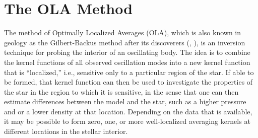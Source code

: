 \documentclass[twocolumn,twocolappendix]{aastex6}
\begin{document}
\section{The OLA Method} \label{sec:ola-method}
The method of Optimally Localized Averages (OLA), which is also known in geology as the Gilbert-Backus method after its discoverers (\citeyear{1968GeoJ...16..169B}, \citeyear{1970RSPTA.266..123B}), is an inversion technique for probing the interior of an oscillating body. 
The idea is to combine the kernel functions of all observed oscillation modes into a new kernel function that is ``localized,'' i.e., sensitive only to a particular region of the star. 
If able to be formed, that kernel function can then be used to investigate the properties of the star in the region to which it is sensitive, in the sense that one can then estimate differences between the model and the star, such as a higher pressure and or a lower density at that location. 
Depending on the data that is available, it may be possible to form zero, one, or more well-localized averaging kernels at different locations in the stellar interior. 
\end{document}
